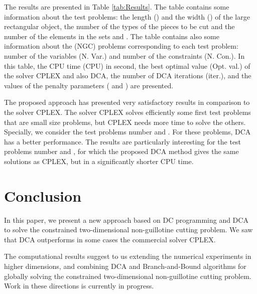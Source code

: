 \documentclass{iesmart}
\begin{document}
The results are presented in Table \ref{tab:Results}. The table
contains some information about the test problems: the length
() and the width () of the large rectangular object, the
number of the types of the pieces to be cut and the number of the
elements in the sets  and . The table contains also some
information about the (NGC) problems corresponding to each test
problem: number of the variables (N. Var.) and number of the
constraints (N. Con.). In this table, the CPU time (CPU) in
second, the best optimal value (Opt. val.) of the solver CPLEX and
also DCA, the number of DCA iterations (iter.), and the values of
the penalty parameters ( and ) are presented.

The proposed approach has presented very satisfactory results in
comparison to the solver CPLEX. The solver CPLEX solves
efficiently
 some first test problems that are small size problems, but CPLEX needs more time to solve the others.
Specially, we consider the test problems number  and .
For these problems, DCA has a better performance. The results are
particularly interesting for the test problems number  and
, for which the proposed DCA method gives the same solutions
as CPLEX, but in a significantly shorter CPU time.

\section{Conclusion}\label{sec:Conclusion}

In this paper, we present a new approach based on DC programming
and DCA to solve the constrained two-dimensional non-guillotine
cutting problem. We saw that DCA outperforms in some cases the
commercial solver CPLEX.

The computational results suggest to us extending the numerical
experiments in higher dimensions, and combining DCA and
Branch-and-Bound algorithms for globally solving the constrained
two-dimensional non-guillotine cutting problem. Work in these
directions is currently in progress.
\end{document}
